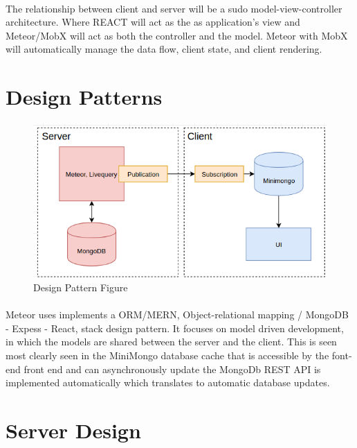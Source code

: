\documentclass[12pt,a4paper]{report}
\begin{document}
		\paragraph {} The relationship between client and server will be a sudo model-view-controller architecture. Where REACT will act as the as application's view and Meteor/MobX will act as both the controller and the model. Meteor with MobX will automatically manage the data flow, client state, and client rendering.
	
	\section { Design Patterns }
		
		\begin{figure}[h]
			\includegraphics[scale=.7]{orm.png}
			\caption{Design Pattern Figure}
			\label{fig: Dasign Pattern }
		\end{figure}
		
		\paragraph{} Meteor uses implements a ORM/MERN, Object-relational mapping / MongoDB - Expess - React, stack design pattern. It focuses on model driven development, in which the models are shared between the server and the client. This is seen most clearly seen in the MiniMongo database cache that is accessible by the font-end front end and can asynchronously update the MongoDb REST API is implemented automatically which translates to automatic database updates.
		


\newpage
\section {Server Design}
\end{document}
